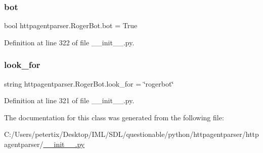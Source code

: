 \subsubsection{\texorpdfstring{bot}{bot}}
{\footnotesize\ttfamily bool httpagentparser.\+Roger\+Bot.\+bot = True\hspace{0.3cm}{\ttfamily [static]}}



Definition at line 322 of file \+\_\+\+\_\+init\+\_\+\+\_\+.\+py.

\hypertarget{classhttpagentparser_1_1_roger_bot_a393ead1441fb4e0ef40ab242db0073e6}{}\label{classhttpagentparser_1_1_roger_bot_a393ead1441fb4e0ef40ab242db0073e6} 
\subsubsection{\texorpdfstring{look\+\_\+for}{look\_for}}
{\footnotesize\ttfamily string httpagentparser.\+Roger\+Bot.\+look\+\_\+for = \char`\"{}rogerbot\char`\"{}\hspace{0.3cm}{\ttfamily [static]}}



Definition at line 321 of file \+\_\+\+\_\+init\+\_\+\+\_\+.\+py.



The documentation for this class was generated from the following file\+:\begin{DoxyCompactItemize}
\item 
C\+:/\+Users/petertix/\+Desktop/\+I\+M\+L/\+S\+D\+L/questionable/python/httpagentparser/httpagentparser/\hyperlink{____init_____8py}{\+\_\+\+\_\+init\+\_\+\+\_\+.\+py}\end{DoxyCompactItemize}
